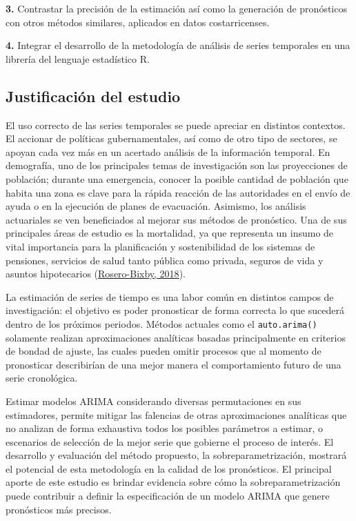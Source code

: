 \documentclass[
]{article}
\begin{document}
\textbf{3.} Contrastar la precisión de la estimación así como la
generación de pronósticos con otros métodos similares, aplicados en
datos costarricenses.

\textbf{4.} Integrar el desarrollo de la metodología de análisis de
series temporales en una librería del lenguaje estadístico R.

\subsection{Justificación del estudio}

El uso correcto de las series temporales se puede apreciar en distintos
contextos. El accionar de políticas gubernamentales, así como de otro
tipo de sectores, se apoyan cada vez más en un acertado análisis de la
información temporal. En demografía, uno de los principales temas de
investigación son las proyecciones de población; durante una emergencia,
conocer la posible cantidad de población que habita una zona es clave
para la rápida reacción de las autoridades en el envío de ayuda o en la
ejecución de planes de evacuación. Asimismo, los análisis actuariales se
ven beneficiados al mejorar sus métodos de pronóstico. Una de sus
principales áreas de estudio es la mortalidad, ya que representa un
insumo de vital importancia para la planificación y sostenibilidad de
los sistemas de pensiones, servicios de salud tanto pública como
privada, seguros de vida y asuntos hipotecarios
(\protect\hyperlink{ref-supenprodc}{Rosero-Bixby, 2018}).

La estimación de series de tiempo es una labor común en distintos campos
de investigación: el objetivo es poder pronosticar de forma correcta lo
que sucederá dentro de los próximos periodos. Métodos actuales como el
\texttt{auto.arima()} solamente realizan aproximaciones analíticas
basadas principalmente en criterios de bondad de ajuste, las cuales
pueden omitir procesos que al momento de pronosticar describirían de una
mejor manera el comportamiento futuro de una serie cronológica.

Estimar modelos ARIMA considerando diversas permutaciones en sus
estimadores, permite mitigar las falencias de otras aproximaciones
analíticas que no analizan de forma exhaustiva todos los posibles
parámetros a estimar, o escenarios de selección de la mejor serie que
gobierne el proceso de interés. El desarrollo y evaluación del método
propuesto, la sobreparametrización, mostrará el potencial de esta
metodología en la calidad de los pronósticos. El principal aporte de
este estudio es brindar evidencia sobre cómo la sobreparametrización
puede contribuir a definir la especificación de un modelo ARIMA que
genere pronósticos más precisos.
\end{document}
